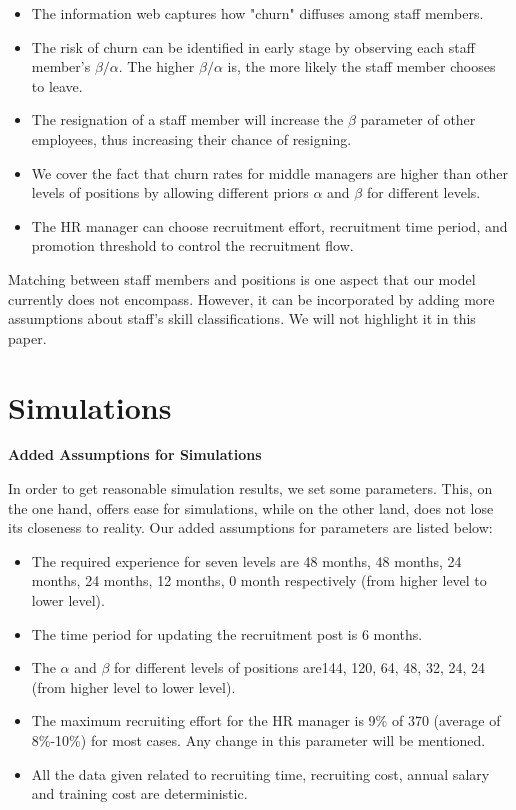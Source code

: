 \documentclass[tcn = 37075, sheet = false, abstract = false]{mcmthesis}
\begin{document}
\begin{itemize}
\item The information web captures how "churn" diffuses among staff members.
\item The risk of churn can be identified in early stage by observing each staff member's $\beta/\alpha$. The higher $\beta/\alpha$ is, the more likely the staff member chooses to leave.
\item The resignation of a staff member will increase the $\beta$ parameter of other employees, thus increasing their chance of resigning.
\item We cover the fact that churn rates for middle managers are higher than other levels of positions by allowing different priors $\alpha$ and $\beta$ for different levels.
\item The HR manager can choose recruitment effort, recruitment time period, and promotion threshold to control the recruitment flow.
\end{itemize}

Matching between staff members and positions is one aspect that our model currently does not encompass. However, it can be incorporated by adding more assumptions about staff's skill classifications. We will not highlight it in this paper.


\section{Simulations}

\textbf{Added Assumptions for Simulations}

In order to get reasonable simulation results, we set some parameters. This, on the one hand, offers ease for simulations, while on the other land, does not lose its closeness to reality. Our added assumptions for parameters are listed below:
\begin{itemize}
\item The required experience for seven levels are 48 months, 48 months, 24 months, 24 months, 12 months, 0 month respectively (from higher level to lower level).
\item The time period for updating the recruitment post is 6 months.
\item The $\alpha$ and $\beta$ for different levels of positions are144, 120, 64, 48, 32, 24, 24 (from higher level to lower level).
\item The maximum recruiting effort for the HR manager is 9\% of 370 (average of 8\%-10\%) for most cases. Any change in this parameter will be mentioned.
\item All the data given related to recruiting time, recruiting cost, annual salary and training cost are deterministic.
\end{itemize}
\end{document}
